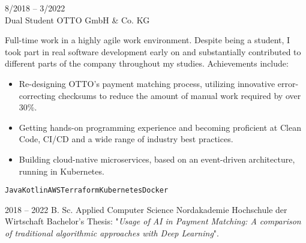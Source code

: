 \documentclass[9pt]{developercv} %
\begin{document}
\begin{entrylist}
        \entry
        {8/2018 -- 3/2022\\}
        {Dual Student}
        {OTTO GmbH \& Co. KG}
        {Full-time work in a highly agile work environment. Despite being a student, I took part in real software
        development early on and substantially contributed to different parts of the company throughout my studies.
        Achievements include:

            \begin{itemize}
                \item Re-designing OTTO's payment matching process, utilizing innovative error-correcting checksums to
                reduce the amount of manual work required by over 30\%.
                \item Getting hands-on programming experience and becoming proficient at Clean Code, CI/CD and a
                wide range of industry best practices.
                \item Building cloud-native microservices, based on an event-driven architecture, running in Kubernetes.
            \end{itemize}
            \texttt{Java}\slashsep\texttt{Kotlin}\slashsep\texttt{AWS}\slashsep\texttt{Terraform}\slashsep\texttt{Kubernetes}\slashsep\texttt{Docker}
        }
    \end{entrylist}

%

    \pagebreak

    \begin{entrylist}
        \entry
        {2018 -- 2022}
        {B. Sc. Applied Computer Science}
        {Nordakademie Hochschule der Wirtschaft}
        {Bachelor's Thesis: "\textit{Usage of AI in Payment Matching: A comparison of traditional algorithmic approaches with Deep Learning}".}
    \end{entrylist}



\end{document}
